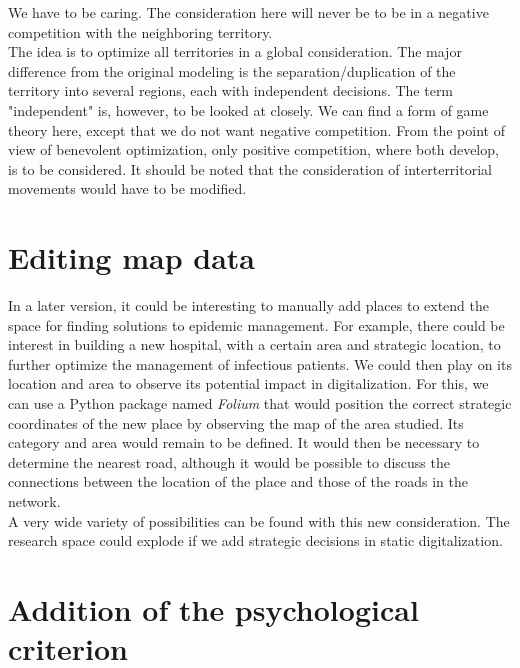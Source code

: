 We have to be caring. The consideration here will never be to be in a negative competition with the neighboring territory.\\

The idea is to optimize all territories in a global consideration. The major difference from the original modeling is the separation/duplication of the territory into several regions, each with independent decisions. The term "independent" is, however, to be looked at closely. We can find a form of game theory here, except that we do not want negative competition. From the point of view of benevolent optimization, only positive competition, where both develop, is to be considered. It should be noted that the consideration of interterritorial movements would have to be modified.\\

\section{Editing map data}

In a later version, it could be interesting to manually add places to extend the space for finding solutions to epidemic management. For example, there could be interest in building a new hospital, with a certain area and strategic location, to further optimize the management of infectious patients. We could then play on its location and area to observe its potential impact in digitalization. For this, we can use a Python package named \textit{Folium} that would position the correct strategic coordinates of the new place by observing the map of the area studied. Its category and area would remain to be defined. It would then be necessary to determine the nearest road, although it would be possible to discuss the connections between the location of the place and those of the roads in the network.\\

A very wide variety of possibilities can be found with this new consideration. The research space could explode if we add strategic decisions in static digitalization.\\

\section{Addition of the psychological criterion}

